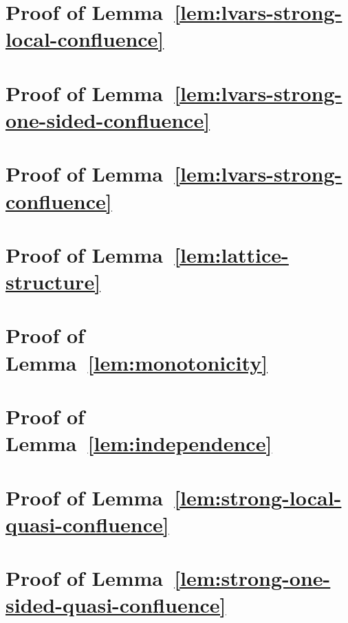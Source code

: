 \section{Proof of Lemma~\ref{lem:lvars-strong-local-confluence}}\label{section:lvars-strong-local-confluence-proof}


\section{Proof of Lemma~\ref{lem:lvars-strong-one-sided-confluence}}\label{section:lvars-strong-one-sided-confluence-proof}


\section{Proof of Lemma~\ref{lem:lvars-strong-confluence}}\label{section:lvars-strong-confluence-proof}


\section{Proof of Lemma~\ref{lem:lattice-structure}}\label{section:lattice-structure-proof}


\section{Proof of Lemma~\ref{lem:monotonicity}}\label{section:monotonicity-proof}


\section{Proof of Lemma~\ref{lem:independence}}\label{section:independence-proof}


\section{Proof of Lemma~\ref{lem:strong-local-quasi-confluence}}\label{section:strong-local-quasi-confluence-proof}


\section{Proof of Lemma~\ref{lem:strong-one-sided-quasi-confluence}}\label{section:strong-one-sided-quasi-confluence-proof}


